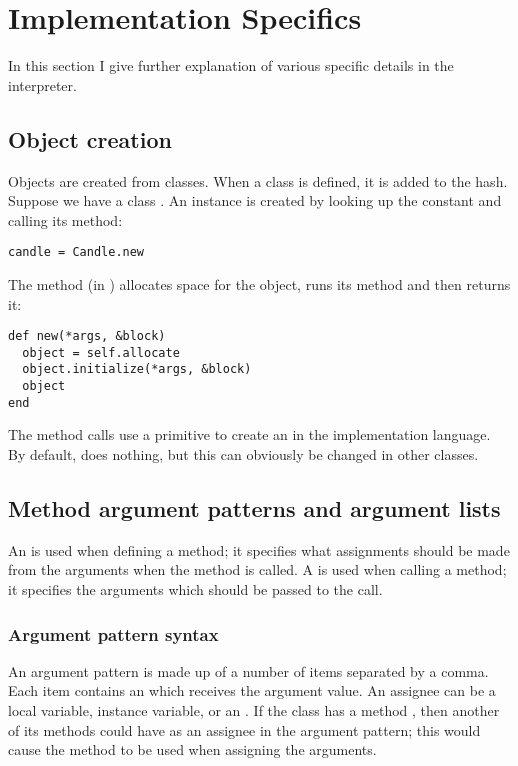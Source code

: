 \section{Implementation Specifics}

In this section I give further explanation of various specific details in the interpreter.

\subsection{Object creation}

Objects are created from classes. When a class is defined, it is added to the  hash. Suppose we have a class . An instance is created by looking up the  constant and calling its  method:

\begin{lstlisting}
candle = Candle.new
\end{lstlisting}

The  method (in ) allocates space for the object, runs its  method and then returns it:

\begin{lstlisting}
def new(*args, &block)
  object = self.allocate
  object.initialize(*args, &block)
  object
end
\end{lstlisting}

The  method calls use a primitive to create an  in the implementation language. By default,  does nothing, but this can obviously be changed in other classes.

\subsection{Method argument patterns and argument lists}
\label{sec:arguments}

An  is used when defining a method; it specifies what assignments should be made from the arguments when the method is called. A  is used when calling a method; it specifies the arguments which should be passed to the call.

\subsubsection{Argument pattern syntax}

An argument pattern is made up of a number of items separated by a comma. Each item contains an  which receives the argument value. An assignee can be a local variable, instance variable, or an . If the class has a method , then another of its methods could have  as an assignee in the argument pattern; this would cause the  method to be used when assigning the arguments.

